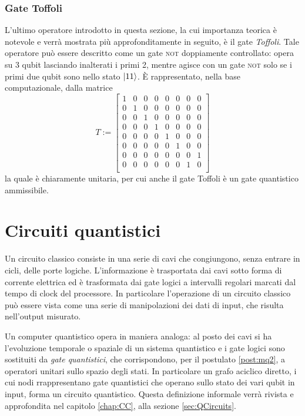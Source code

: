 \subsubsection{Gate Toffoli}
L'ultimo operatore introdotto in questa sezione, la cui importanza teorica è notevole e verrà mostrata più approfonditamente in seguito, è il gate \textit{Toffoli}.
Tale operatore può essere descritto come un gate \textsc{not} doppiamente controllato: opera su 3 qubit lasciando inalterati i primi 2, mentre agisce con un gate \textsc{not} solo se i primi due qubit sono nello stato $\ket{11}$. È rappresentato, nella base computazionale, dalla matrice
\begin{equation}\label{eqn:Toffoli}
 T :=
 \begin{bmatrix}
      1 & 0 & 0 & 0 & 0 & 0 & 0 & 0 \\
      0 & 1 & 0 & 0 & 0 & 0 & 0 & 0 \\
      0 & 0 & 1 & 0 & 0 & 0 & 0 & 0 \\
      0 & 0 & 0 & 1 & 0 & 0 & 0 & 0 \\
      0 & 0 & 0 & 0 & 1 & 0 & 0 & 0 \\
      0 & 0 & 0 & 0 & 0 & 1 & 0 & 0 \\
      0 & 0 & 0 & 0 & 0 & 0 & 0 & 1 \\
      0 & 0 & 0 & 0 & 0 & 0 & 1 & 0 \\
 \end{bmatrix}
\end{equation}
la quale è chiaramente unitaria, per cui anche il gate Toffoli è un gate quantistico ammissibile.

\section{Circuiti quantistici}\label{sec:gate_quantistici}
Un circuito classico consiste in una serie di cavi che congiungono, senza entrare in cicli, delle porte logiche.
L'informazione è trasportata dai cavi sotto forma di corrente elettrica ed è trasformata dai gate logici a intervalli regolari marcati dal tempo di clock del processore.
In particolare l'operazione di un circuito classico può essere vista come una serie di manipolazioni dei dati di input, che risulta nell'output misurato.

Un computer quantistico opera in maniera analoga: al posto dei cavi si ha l'evoluzione temporale o spaziale di un sistema quantistico e i gate logici sono sostituiti da \textit{gate quantistici}, che corrispondono, per il postulato \ref{post:mq2}, a operatori unitari sullo spazio degli stati.
In particolare un grafo aciclico diretto, i cui nodi rrappresentano gate quantistici che operano sullo stato dei vari qubit in input, forma un circuito quantistico.
Questa definizione informale verrà rivista e approfondita nel capitolo \ref{chap:CC}, alla sezione \ref{sec:QCircuits}.

